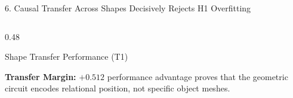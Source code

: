 \documentclass[aspectratio=169, 10pt]{beamer}
\begin{document}
\begin{frame}{6. Causal Transfer Across Shapes Decisively Rejects H1 Overfitting}
\begin{columns}[T]
\begin{column}{0.48\textwidth}
\begin{block}{Shape Transfer Performance (T1)}
      \end{block}
      \scriptsize \textbf{Transfer Margin:} $+0.512$ performance advantage proves that the geometric circuit encodes relational position, not specific object meshes.
    \end{column}
  \end{columns}
\end{frame}

\end{document}
